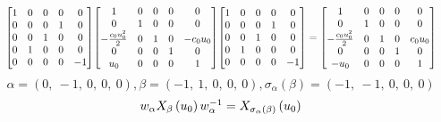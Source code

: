 \documentclass[11pt]{article}
\theoremstyle{definition}
\begin{document}
\[
\scaletoalign{\textwidth}{{\left[\begin{matrix}1 & 0 & 0 & 0 & 0\\0 & 0 & 0 & 1 & 0\\0 & 0 & 1 & 0 & 0\\0 & 1 & 0 & 0 & 0\\0 & 0 & 0 & 0 & -1\end{matrix}\right]} {\left[\begin{matrix}1 & 0 & 0 & 0 & 0\\0 & 1 & 0 & 0 & 0\\- \frac{c_{0} u_{0}^{2}}{2} & 0 & 1 & 0 & - c_{0} u_{0}\\0 & 0 & 0 & 1 & 0\\u_{0} & 0 & 0 & 0 & 1\end{matrix}\right]} {\left[\begin{matrix}1 & 0 & 0 & 0 & 0\\0 & 0 & 0 & 1 & 0\\0 & 0 & 1 & 0 & 0\\0 & 1 & 0 & 0 & 0\\0 & 0 & 0 & 0 & -1\end{matrix}\right]} = {\left[\begin{matrix}1 & 0 & 0 & 0 & 0\\0 & 1 & 0 & 0 & 0\\- \frac{c_{0} u_{0}^{2}}{2} & 0 & 1 & 0 & c_{0} u_{0}\\0 & 0 & 0 & 1 & 0\\- u_{0} & 0 & 0 & 0 & 1\end{matrix}\right]}}
\]
\[
\alpha = \left( 0, \  -1, \  0, \  0, \  0\right), \beta = \left( -1, \  1, \  0, \  0, \  0\right), \sigma_{\alpha}(\beta) = \left( -1, \  -1, \  0, \  0, \  0\right)
\]
\[
\scaletoalign{\textwidth}{w_{\alpha} X_{\beta}\left(u_{0}\right) w_{\alpha}^{-1} = X_{\sigma_{\alpha}\left(\beta\right)}\left(u_{0}\right)}
\]
\end{document}
